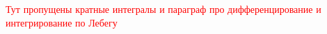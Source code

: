 \textcolor{red}{Тут пропущены кратные интегралы и параграф про дифференцирование и интегрирование по Лебегу}